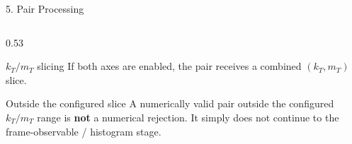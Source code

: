 \documentclass{beamer}
\begin{document}
\begin{frame}{5. Pair Processing}
\begin{columns}[T]
\begin{column}{0.53\textwidth}
\begin{block}{$k_T/m_T$ slicing}
If both axes are enabled, the pair receives a combined $(k_T,m_T)$ slice.
\end{block}

\begin{block}{Outside the configured slice}
A numerically valid pair outside the configured $k_T/m_T$ range is \textbf{not} a numerical rejection. It simply does not continue to the frame-observable / histogram stage.
\end{block}
\end{column}

\end{columns}

\vfill
\begin{center}
\end{center}

\end{frame}
\end{document}
